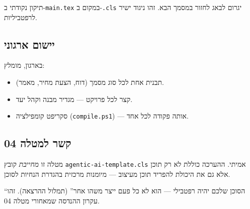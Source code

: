 \begin{warningbox}
תיקון נקודתי ב-\texttt{main.tex} במקום ב-\texttt{.cls} יגרום לבאג
לחזור במסמך הבא. זהו ניגוד ישיר לרפטביליות.
\end{warningbox}


\subsection{יישום ארגוני}

בארגון, מומלץ:
\begin{itemize}[rightmargin=2em]
  \item תבנית  אחת לכל סוג מסמך (דוח, הצעת מחיר, מאמר).
  \item {} קצר לכל פרויקט --- מגדיר מבנה וקהל יעד.
  \item סקריפט קומפילציה (\texttt{compile.ps1}) --- אותה פקודה לכל אחד.
\end{itemize}

\subsection{קשר למטלה 04}

מטלה זו \emph{מחייבת} קובץ \texttt{agentic-ai-template.cls} אמיתי.
ההערכה כוללת לא רק תוכן אלא גם את היכולת להפריד תוכן מעיצוב --- מיומנות
מרכזית בהגדרת הנחיות לסוכן.

\begin{insightbox}
``הסוכן שלכם יהיה רפטבילי --- הוא לא כל פעם ייצר משהו אחר'' (תמלול
ההרצאה). זהו עקרון ההנדסה שמאחורי מטלה 04.
\end{insightbox}
